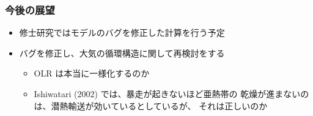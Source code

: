\documentclass[aspectratio=149,9pt,fleqn]{beamer}
\begin{document}
\begin{frame}
	\frametitle{今後の展望}
	\begin{itemize}
		\item 修士研究ではモデルのバグを修正した計算を行う予定
		\item バグを修正し、大気の循環構造に関して再検討をする
			\begin{itemize}
				\item OLR は本当に一様化するのか
				\item Ishiwatari \etal (2002) では、暴走が起きないほど亜熱帯の
					乾燥が進まないのは、潜熱輸送が効いているとしているが、
					それは正しいのか
			\end{itemize}
	\end{itemize}
\end{frame}
\end{document}
